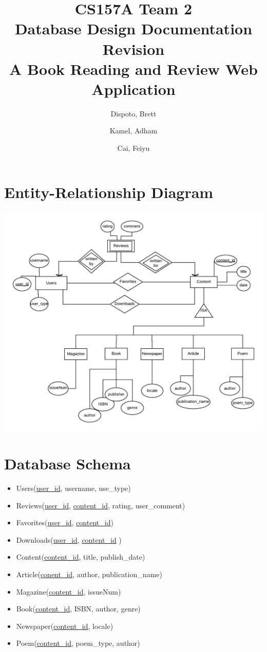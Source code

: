 \documentclass[letter, 12pt, titlepage]{article}
\author{
	Dispoto, Brett\\
        \and
        Kamel, Adham\\
        \and
        Cai, Feiyu\\
}
\title{CS157A Team 2 \\ Database Design Documentation Revision \\
        \large A Book Reading and Review Web Application}
\begin{document}
  \maketitle
  	\section{Entity-Relationship Diagram}
	\includegraphics[scale=1]{erd-rev.png}
	\section{Database Schema}
		\begin{itemize}
			\item Users(\underline{user\_id}, username, use\_type)
			\item Reviews(\underline{user\_id}, \underline{content\_id}, rating, user\_comment)
			\item Favorites(\underline{user\_id}, \underline{content\_id})
			\item Downloads(\underline{user\_id}, \underline{content\_id} )
			\item Content(\underline{content\_id}, title, publish\_date)
			\item Article(\underline{conent\_id}, author, publication\_name)
			\item Magazine(\underline{content\_id}, issueNum)
			\item Book(\underline{content\_id}, ISBN, author, genre)
			\item Newspaper(\underline{content\_id}, locale)
			\item Poem(\underline{content\_id}, poem\_type, author)
		\end{itemize}
\end{document}
